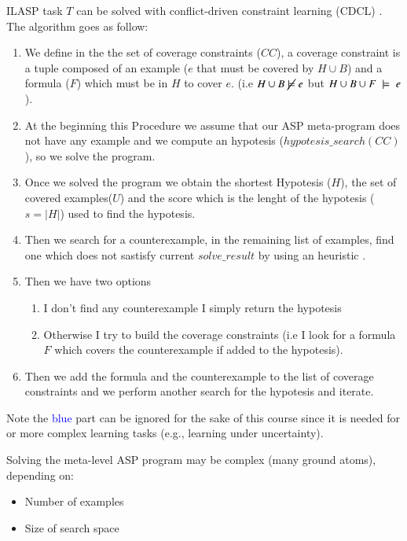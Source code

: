 ILASP task $T$ can be solved with conflict-driven constraint learning (CDCL) \cite{law_2023}.
The algorithm goes as follow:
\begin{enumerate}
    \item We define in the the set of coverage constraints ($CC$), 
    a coverage constraint is a tuple composed of an example ($e$ that must be
    covered by $H \cup B$) and a formula ($F$) which must be in $H$
    to cover $e$. (i.e $H \cup B \;\cancel{\models}\; e$ but $H \cup B \cup F \;\models\; e$).
    \item At the beginning this Procedure we assume that our ASP meta-program does not have any 
    example and we compute an hypotesis ($hypotesis\_search(CC)$), so we solve the program.
    \item Once we solved the program we obtain the shortest Hypotesis ($H$), the set of covered 
    examples($U$) and the score which is the lenght of the hypotesis ($s=|H|$) used to find the hypotesis.
    \item Then we search for a counterexample, in the remaining list of examples, find one
    which does not sastisfy current $solve\_result$ by using an heuristic \cite{law_russo_broda_2016}.
    \item Then we have two options
    \begin{enumerate}
        \item I don't find any counterexample I simply return the hypotesis
        \item Otherwise I try to build the coverage constraints (i.e I look for a formula 
        $F$ which covers the counterexample if added to the hypotesis).
    \end{enumerate}
    \item Then we add the formula and the counterexample to the list of coverage constraints and 
    we perform another search for the hypotesis and iterate.
\end{enumerate}
Note the \textcolor{Blue}{blue} part can be ignored for the sake of this course since it is needed for or more
complex learning tasks (e.g., learning under uncertainty).

Solving the meta-level ASP program may be complex (many ground atoms), depending on:
\begin{itemize}
    \item Number of examples
    \item Size of search space
\end{itemize}